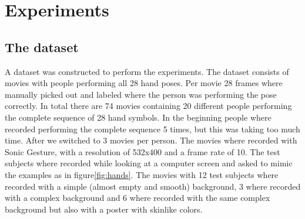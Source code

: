 
\chapter{Experiments}
\label{ch:experiments}


\section{The dataset}
A dataset was constructed to perform the experiments. The dataset consists of movies with people performing all 28 hand poses. Per movie 28 frames where manually picked out and labeled where the person was performing the pose correctly. In total there are 74 movies containing 20 different people performing the complete sequence of 28 hand symbols. In the beginning people where recorded performing the complete sequence 5 times, but this was taking too much time. After we switched to 3 movies per person. The movies where recorded with Sonic Gesture, with a resolution of 532x400 and a frame rate of 10. The test subjects where recorded while looking at a computer screen and asked to mimic the examples as in figure\ref{fig:hands}. The movies with 12 test subjects where recorded with a simple (almost empty and smooth) background, 3 where recorded with a complex background and 6 where recorded with the same complex background but also with a poster with skinlike colors.




